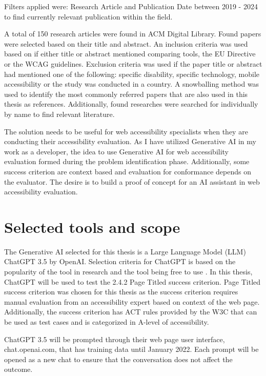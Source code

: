 Filters applied were: Research Article and Publication Date between 2019 - 2024 to find currently relevant publication within the field. 

A total of 150 research articles were found in ACM Digital Library. Found papers were selected based on their title and abstract. An inclusion criteria was used based on if either title or abstract mentioned comparing tools, the EU Directive or the WCAG guidelines. Exclusion criteria was used if the paper title or abstract had mentioned one of the following: specific disability, specific technology, mobile accessibility or the study was conducted in a country. A snowballing method was used to identify the most commonly referred papers that are also used in this thesis as references. Additionally, found researches were searched for individually by name to find relevant literature.

The solution needs to be useful for web accessibility specialists when they are conducting their accessibility evaluation. As I have utilized Generative AI in my work as a developer, the idea to use Generative AI for web accessibility evaluation formed during the problem identification phase. Additionally, some success criterion are context based and evaluation for conformance depends on the evaluator. The desire is to build a proof of concept for an AI assistant in web accessibility evaluation.

\section{Selected tools and scope}

The Generative AI selected for this thesis is a Large Language Model (LLM) ChatGPT 3.5 by OpenAI. Selection criteria for ChatGPT is based on the popularity of the tool in research and the tool being free to use \citep{ouyang2023llm, white2023prompt}. In this thesis, ChatGPT will be used to test the 2.4.2 Page Titled success criterion. Page Titled success criterion was chosen for this thesis as the success criterion requires manual evaluation from an accessibility expert based on context of the web page. Additionally, the success criterion has ACT rules provided by the W3C that can be used as test cases and is categorized in A-level of accessibility. 

ChatGPT 3.5 will be prompted through their web page user interface, chat.openai.com, that has training data until January 2022. Each prompt will be opened as a new chat to ensure that the conversation does not affect the outcome. 

